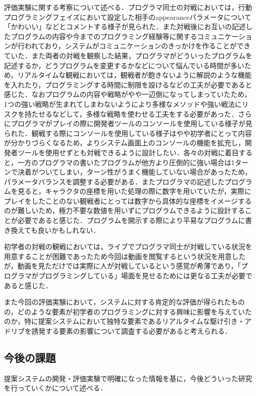 評価実験に関する考察について述べる．プログラマ同士の対戦においては，行動プログラミングフェイズにおいて設定した相手のappearanceパラメータについて「かわいい」などとコメントする様子が見られた．また対戦後にお互いの記述したプログラムの内容や今までのプログラミング経験等に関するコミュニケーションが行われており，システムがコミュニケーションのきっかけを作ることができていた．また両者の対戦を観察した結果，プログラマがどういったプログラムを記述するか，どうプログラムを変更するかなどについて悩んでいる時間が多いため，リアルタイムな観戦においては，観戦者が飽きないように解説のような機能を入れたり，プログラミングする時間に制限を設けるなどの工夫が必要であると感じた．なおプログラムの内容や戦略がやや一辺倒になってしまっていたため，1つの強い戦略が生まれてしまわないようにより多様なメソッドや強い戦法にリスクを持たせるなどして，多様な戦略を使わせる工夫をする必要があった．さらにプログラマがプレイの際に開発者ツールのコンソールを使用している様子が見られた．観戦する際にコンソールを使用している様子はやや初学者にとって内容が分かりづらくなるため，よりシステム画面上のコンソールの機能を拡充し，開発者ツールを使用せずとも対戦できるように設計したい．各々の対戦に着目すると，一方のプログラマの書いたプログラムが他方より圧倒的に強い場合は1ターンで決着がついてしまい，ターン性がうまく機能していない場合があったため，パラメータバランスを調整する必要がある．またプログラマの記述したプログラムを見ると，キャラクタの座標を用いた処理の際に数字を用いていたが，実際にプレイをしたことのない観戦者にとっては数字から具体的な座標をイメージするのが難しいため，極力不要な数値を用いずにプログラムできるように設計することが必要であると感じた．プログラムを開示する際により平易なプログラムに書き換えても良いかもしれない．

初学者の対戦の観戦においては，ライブでプログラマ同士が対戦している状況を用意することが困難であったため今回は動画を閲覧するという状況を用意したが，動画を見ただけでは実際に人が対戦しているという感覚が希薄であり，「プログラマがプログラミングしている」場面を見せるためには更なる工夫が必要であると感じた．

また今回の評価実験において，システムに対する肯定的な評価が得られたものの，どのような要素が初学者のプログラミングに対する興味に影響を与えていたのか，特に提案システムにおいて独特な要素であるリアルタイムな駆け引き・アドリブを誘発する要素の影響について調査する必要があると考えられる．

\subsection{今後の課題}
提案システムの開発・評価実験で明確になった情報を基に，今後どういった研究を行っていくかについて述べる．

